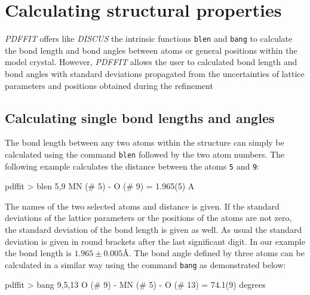 
\chapter{Calculating structural properties \label{misc}}

{\it PDFFIT} offers like {\it DISCUS} the intrinsic functions
{\tt blen} and {\tt bang} to calculate the bond length and bond
angles between atoms or general positions within the model
crystal. However, {\it PDFFIT} allows the user to calculated
bond length and bond angles with standard deviations propagated
from the uncertainties of lattice parameters and positions obtained
during the refinement


\section{Calculating single bond lengths and angles \label{misc_simp}}

The bond length between any two atoms within the structure can simply
be calculated using the command {\tt blen} followed by the two atom
numbers. The following example calculates the distance between the
atoms {\tt 5} and {\tt 9}:

\footnotesize
\begin{MacVerbatim}
   pdffit > blen 5,9
       MN (#    5) -    O (#    9)   =   1.965(5) A
\end{MacVerbatim}
\normalsize

\noindent The names of the two selected atoms and distance is
given. If the standard deviations of the lattice parameters or the
positions of the atoms are not zero, the standard deviation of the
bond length is given as well. As usual the standard deviation is
given in round brackets after the last significant digit. In our
example the bond length is $1.965 \pm 0.005$\AA. The bond angle
defined by three atoms can be calculated in a similar way using
the command {\tt bang} as demonstrated below:

\footnotesize
\begin{MacVerbatim}
   pdffit > bang 9,5,13
       O (#    9) -   MN (#    5) -    O (#   13)   =   74.1(9) degrees
\end{MacVerbatim}
\normalsize


